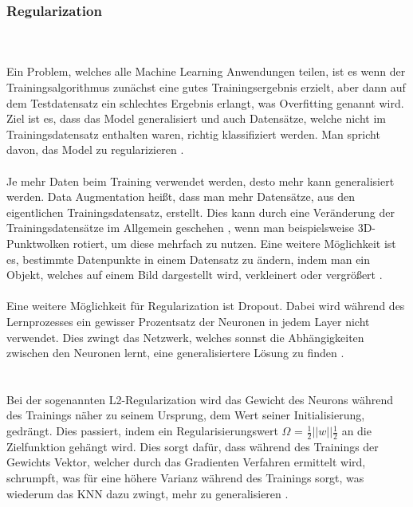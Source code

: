 \documentclass{llncs}
\begin{document}
\subsubsection{Regularization}
~\\\\
Ein Problem, welches alle Machine Learning Anwendungen teilen, ist es wenn der Trainingsalgorithmus zunächst eine gutes Trainingsergebnis erzielt, aber dann auf dem Testdatensatz ein schlechtes Ergebnis erlangt, was Overfitting genannt wird. Ziel ist es, dass das Model generalisiert und auch Datensätze, welche nicht im Trainingsdatensatz enthalten waren, richtig klassifiziert werden. Man spricht davon, das Model zu regularizieren \cite{Grundlagen}.
~\\\\
Je mehr Daten beim Training verwendet werden, desto mehr kann generalisiert werden. Data Augmentation heißt, dass man mehr Datensätze, aus den eigentlichen Trainingsdatensatz, erstellt. Dies kann durch eine Veränderung der Trainingsdatensätze im Allgemein geschehen \cite{Grundlagen}, wenn man beispielsweise 3D-Punktwolken rotiert, um diese mehrfach zu nutzen. Eine weitere Möglichkeit ist es, bestimmte Datenpunkte in einem Datensatz zu ändern, indem man ein Objekt, welches auf einem Bild dargestellt wird, verkleinert oder vergrößert \cite{Grundlagen}.
~\\\\
\pagebreak\linebreak 
Eine weitere Möglichkeit für Regularization ist Dropout. Dabei wird während des Lernprozesses ein gewisser Prozentsatz der Neuronen in jedem Layer nicht verwendet. Dies zwingt das Netzwerk, welches sonnst die Abhängigkeiten zwischen den Neuronen lernt, eine generalisiertere Lösung zu finden \cite{dropout}.\\
~\\\\
Bei der sogenannten L2-Regularization wird das Gewicht des Neurons während des Trainings näher zu seinem Ursprung, dem Wert seiner Initialisierung, gedrängt. Dies passiert, indem ein Regularisierungswert $\Omega$ = $\frac{1}{2}||w||\frac{1}{2}$ an die Zielfunktion gehängt wird. Dies sorgt dafür, dass während des Trainings der Gewichts Vektor, welcher durch das Gradienten Verfahren ermittelt wird, schrumpft, was für eine höhere Varianz während des Trainings sorgt, was wiederum das KNN dazu zwingt, mehr zu generalisieren \cite{Grundlagen}.\\ 
\end{document}
